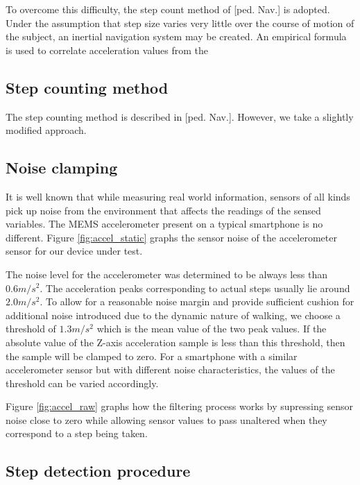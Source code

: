 To overcome this difficulty, the step count method of [ped. Nav.] is adopted. 
Under the assumption that step size varies very little over the course of 
motion of the subject, an inertial navigation system may be created. An
empirical formula is used to correlate acceleration values from 
the 

\subsection{Step counting method}

The step counting method is described in [ped. Nav.]. However, we take a
slightly modified approach. 


\subsection{Noise clamping\label{sec:NoiseClamping}}

It is well known that while measuring real world information, sensors of all 
kinds pick up noise from the environment that affects the readings of the 
sensed variables. The MEMS accelerometer present on a typical smartphone is 
no different. Figure \ref{fig:accel_static} graphs the sensor noise of 
the accelerometer sensor for our device under test.

The noise level for the accelerometer was determined to be always less
than $0.6 m/s^2$. The acceleration peaks corresponding to actual steps usually
lie around $2.0 m/s^2$. To allow for a reasonable noise margin and provide
sufficient cushion for additional noise introduced due to the dynamic nature of
walking, we choose a threshold of $1.3 m/s^2$ which is the mean value of the two
peak values. If the absolute value of the Z-axis acceleration sample is less
than this threshold, then the sample will be clamped to zero. For a smartphone
with a similar accelerometer sensor but with different noise characteristics,
the values of the threshold can be varied accordingly. 

Figure \ref{fig:accel_raw} graphs how the filtering process works by
supressing sensor noise close to zero while allowing sensor values to 
pass unaltered when they correspond to a step being taken.

\subsection{Step detection procedure\label{sec:step_detection}}

